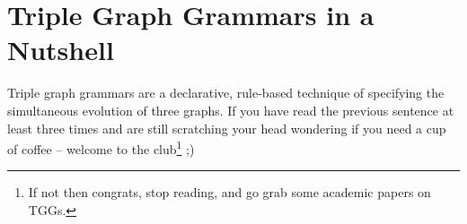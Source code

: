 \section{Triple Graph Grammars in a Nutshell}

Triple graph grammars are a declarative, rule-based technique of specifying the simultaneous evolution of three graphs.
If you have read the previous sentence at least three times and are still scratching your head wondering if you need a cup of coffee -- welcome to the club\footnote{If not then congrats, stop reading, and go grab some academic papers on TGGs.} ;)

